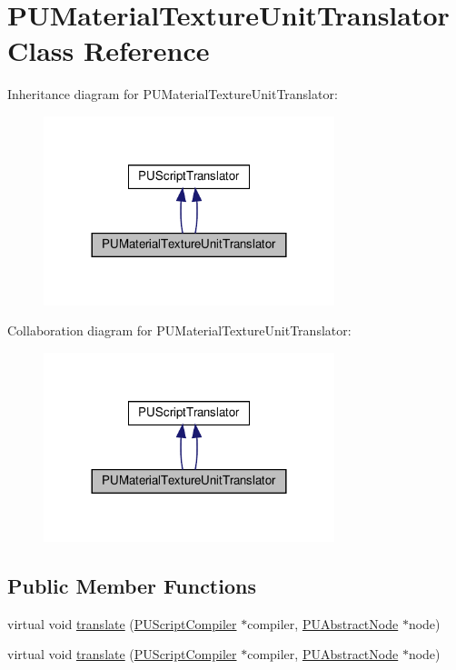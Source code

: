 \hypertarget{classPUMaterialTextureUnitTranslator}{}\section{P\+U\+Material\+Texture\+Unit\+Translator Class Reference}
\label{classPUMaterialTextureUnitTranslator}


Inheritance diagram for P\+U\+Material\+Texture\+Unit\+Translator\+:
\nopagebreak
\begin{figure}[H]
\begin{center}
\leavevmode
\includegraphics[width=240pt]{classPUMaterialTextureUnitTranslator__inherit__graph}
\end{center}
\end{figure}


Collaboration diagram for P\+U\+Material\+Texture\+Unit\+Translator\+:
\nopagebreak
\begin{figure}[H]
\begin{center}
\leavevmode
\includegraphics[width=240pt]{classPUMaterialTextureUnitTranslator__coll__graph}
\end{center}
\end{figure}
\subsection*{Public Member Functions}
\begin{DoxyCompactItemize}
\item 
virtual void \hyperlink{classPUMaterialTextureUnitTranslator_aa5dc7549395c449c2c920f69eb35db3f}{translate} (\hyperlink{classPUScriptCompiler}{P\+U\+Script\+Compiler} $\ast$compiler, \hyperlink{classPUAbstractNode}{P\+U\+Abstract\+Node} $\ast$node)
\item 
virtual void \hyperlink{classPUMaterialTextureUnitTranslator_a38d90b793859446a52a7eb866af8b465}{translate} (\hyperlink{classPUScriptCompiler}{P\+U\+Script\+Compiler} $\ast$compiler, \hyperlink{classPUAbstractNode}{P\+U\+Abstract\+Node} $\ast$node)
\end{DoxyCompactItemize}
